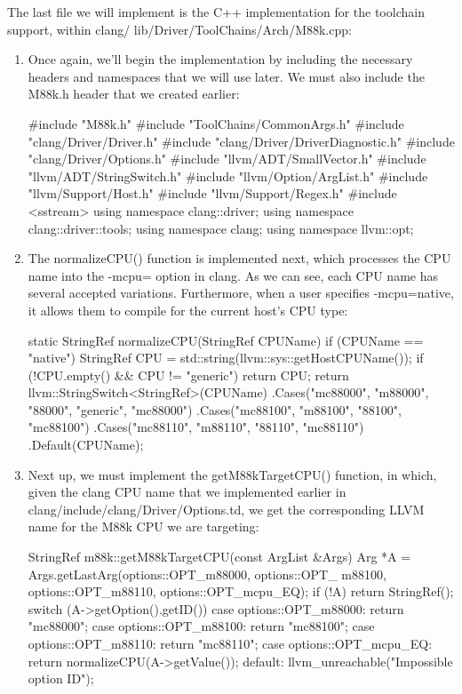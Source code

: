 The last file we will implement is the C++ implementation for the toolchain support, within clang/ lib/Driver/ToolChains/Arch/M88k.cpp:

\begin{enumerate}
\item
Once again, we’ll begin the implementation by including the necessary headers and namespaces that we will use later. We must also include the M88k.h header that we created earlier:

\begin{cpp}
#include "M88k.h"
#include "ToolChains/CommonArgs.h"
#include "clang/Driver/Driver.h"
#include "clang/Driver/DriverDiagnostic.h"
#include "clang/Driver/Options.h"
#include "llvm/ADT/SmallVector.h"
#include "llvm/ADT/StringSwitch.h"
#include "llvm/Option/ArgList.h"
#include "llvm/Support/Host.h"
#include "llvm/Support/Regex.h"
#include <sstream>
using namespace clang::driver;
using namespace clang::driver::tools;
using namespace clang;
using namespace llvm::opt;
\end{cpp}

\item
The normalizeCPU() function is implemented next, which processes the CPU name into the -mcpu= option in clang. As we can see, each CPU name has several accepted variations. Furthermore, when a user specifies -mcpu=native, it allows them to compile for the current host’s CPU type:

\begin{cpp}
static StringRef normalizeCPU(StringRef CPUName) {
    if (CPUName == "native") {
        StringRef CPU = std::string(llvm::sys::getHostCPUName());
        if (!CPU.empty() && CPU != "generic")
        return CPU;
    }
    return llvm::StringSwitch<StringRef>(CPUName)
    .Cases("mc88000", "m88000", "88000", "generic", "mc88000")
    .Cases("mc88100", "m88100", "88100", "mc88100")
    .Cases("mc88110", "m88110", "88110", "mc88110")
    .Default(CPUName);
}
\end{cpp}

\item
Next up, we must implement the getM88kTargetCPU() function, in which, given the clang CPU name that we implemented earlier in clang/include/clang/Driver/Options.td, we get the corresponding LLVM name for the M88k CPU we are targeting:

\begin{cpp}
StringRef m88k::getM88kTargetCPU(const ArgList &Args) {
    Arg *A = Args.getLastArg(options::OPT_m88000, options::OPT_
        m88100, options::OPT_m88110, options::OPT_mcpu_EQ);
    if (!A)
        return StringRef();
    switch (A->getOption().getID()) {
    case options::OPT_m88000:
        return "mc88000";
    case options::OPT_m88100:
        return "mc88100";
    case options::OPT_m88110:
        return "mc88110";
    case options::OPT_mcpu_EQ:
        return normalizeCPU(A->getValue());
    default:
        llvm_unreachable("Impossible option ID");
    }
}
\end{cpp}


\end{enumerate}
